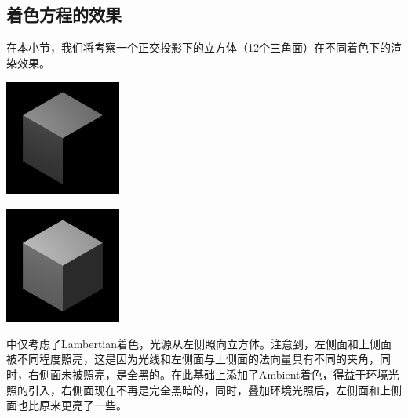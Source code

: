 \subsection{着色方程的效果}
在本小节，我们将考察一个正交投影下的立方体（12个三角面）在不同着色下的渲染效果。
\begin{Figure}[Lambertian着色和Ambient着色]
    \begin{FigureSub}[Lambertian着色]
        \includegraphics[width=3.8cm]{image/Cube1.jpg}
    \end{FigureSub}
    \hspace{0.5cm}
    \begin{FigureSub}[Ambient着色]
        \includegraphics[width=3.8cm]{image/Cube2.jpg}
    \end{FigureSub}
\end{Figure}
中仅考虑了Lambertian着色，光源从左侧照向立方体。注意到，左侧面和上侧面被不同程度照亮，这是因为光线和左侧面与上侧面的法向量具有不同的夹角，同时，右侧面未被照亮，是全黑的。在此基础上添加了Ambient着色，得益于环境光照的引入，右侧面现在不再是完全黑暗的，同时，叠加环境光照后，左侧面和上侧面也比原来更亮了一些。


